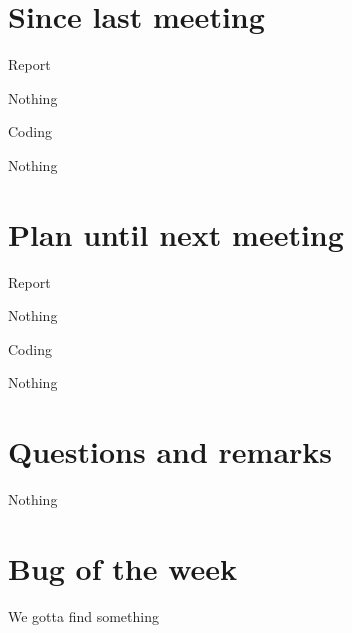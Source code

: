 \documentclass[a4paper,11pt,agenda,chair]{meetingmins}
\begin{document}
\maketitle

\section{Since last meeting}
\begin{items}
\item Report
	\begin{items}
		\item Nothing
	\end{items}
\item Coding
	\begin{items}
		\item Nothing
	\end{items}
\end{items}

\section{Plan until next meeting}
\begin{items}
\item Report
	\begin{items}
		\item Nothing
	\end{items}
\item Coding
	\begin{items}
		\item Nothing
	\end{items}
\end{items}

\section{Questions and remarks}
\begin{items}
	\item Nothing
\end{items}



\section{Bug of the week}
We gotta find something
\end{document}

